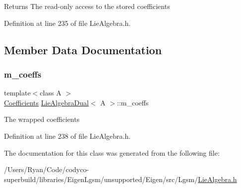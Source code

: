 \begin{DoxyReturn}{Returns}
The read-\/only access to the stored coefficients 
\end{DoxyReturn}


Definition at line 235 of file Lie\+Algebra.\+h.



\subsection{Member Data Documentation}
\hypertarget{class_lie_algebra_dual_a14e27002abc8d9b40891ff0f613f0546}{}\label{class_lie_algebra_dual_a14e27002abc8d9b40891ff0f613f0546} 
\subsubsection{\texorpdfstring{m\+\_\+coeffs}{m\_coeffs}}
{\footnotesize\ttfamily template$<$class A $>$ \\
\hyperlink{class_lie_algebra_dual_a82710c51eb4d0b6cbd190e76a33fbc17}{Coefficients} \hyperlink{class_lie_algebra_dual}{Lie\+Algebra\+Dual}$<$ A $>$\+::m\+\_\+coeffs\hspace{0.3cm}{\ttfamily [protected]}}

The wrapped coefficients 

Definition at line 238 of file Lie\+Algebra.\+h.



The documentation for this class was generated from the following file\+:\begin{DoxyCompactItemize}
\item 
/\+Users/\+Ryan/\+Code/codyco-\/superbuild/libraries/\+Eigen\+Lgsm/unsupported/\+Eigen/src/\+Lgsm/\hyperlink{_lie_algebra_8h}{Lie\+Algebra.\+h}\end{DoxyCompactItemize}
